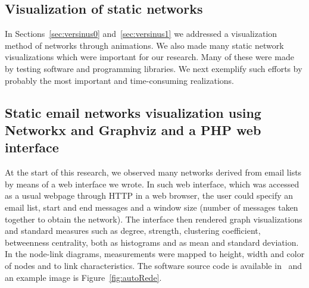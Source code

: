\begin{apendicesenv}
	\section{Visualization of static networks}
	In Sections~\ref{sec:versinus0} and~\ref{sec:versinus1} we addressed a visualization method of networks through animations.
	We also made many static network visualizations which were important for our research.
	Many of these were made by testing software and programming libraries.
	We next exemplify such efforts by probably the most important and time-consuming realizations.

	\subsection{Static email networks visualization using Networkx and Graphviz and a PHP web interface}\label{sec:autoRede}
	At the start of this research, we observed many networks derived from email lists
	by means of a web interface we wrote.
	In such web interface, which was accessed as a usual webpage through HTTP in a web browser, 
	the user could specify an email list, start and end messages and a window size (number of messages taken together to obtain the network).
	The interface then rendered graph visualizations and standard measures such as degree, strength, clustering coefficient, betweenness centrality, both as histograms and as mean and standard deviation.
	In the node-link diagrams, measurements were mapped to height, width and color of nodes and to link characteristics.
	The software source code is available in~\cite{autoRede} and an example image is Figure~\ref{fig:autoRede}.
\begin{figure}[h!]
\begin{center}

\end{center}
\end{figure}
\end{apendicesenv}
